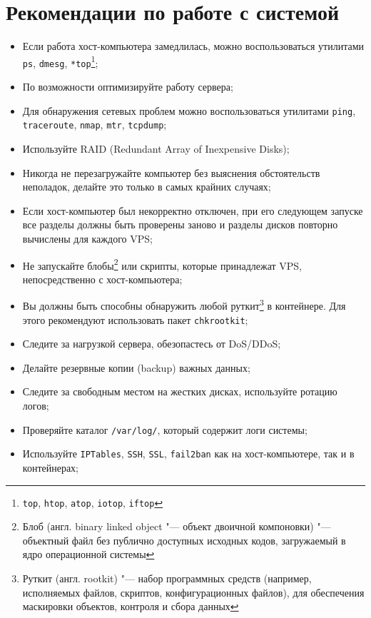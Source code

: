 \section{Рекомендации по работе с системой}
\begin{itemize}
    \item Если работа хост-компьютера замедлилась, можно воспользоваться утилитами \texttt{ps}, \texttt{dmesg}, \texttt{*top}\footnote{\texttt{top}, \texttt{htop}, \texttt{atop}, \texttt{iotop}, \texttt{iftop}};
    \item По возможности оптимизируйте работу сервера;
    \item Для обнаружения сетевых проблем можно воспользоваться утилитами \texttt{ping}, \texttt{traceroute}, \texttt{nmap}, \texttt{mtr}, \texttt{tcpdump};
    \item Используйте RAID (Redundant Array of Inexpensive Disks);
    \item Никогда не перезагружайте компьютер без выяснения обстоятельств неполадок, делайте это только в самых крайних случаях;
    \item Если хост-компьютер был некорректно отключен, при его следующем запуске все разделы должны быть проверены заново и разделы дисков повторно вычислены для каждого VPS;
    \item Не запускайте блобы\footnote{Блоб (англ. binary linked object "--- объект двоичной компоновки) "--- объектный файл без публично доступных исходных кодов, загружаемый в ядро операционной системы} или скрипты, которые принадлежат VPS, непосредственно с хост-компьютера;
    \item Вы должны быть способны обнаружить любой руткит\footnote{Руткит (англ. rootkit) "--- набор программных средств (например, исполняемых файлов, скриптов, конфигурационных файлов), для обеспечения маскировки объектов, контроля и сбора данных} в контейнере. Для этого рекомендуют использовать пакет \texttt{chkrootkit};
    \item Следите за нагрузкой сервера, обезопастесь от DoS/DDoS;
    \item Делайте резервные копии (backup) важных данных;
    \item Следите за свободным местом на жестких дисках, используйте ротацию логов;
    \item Проверяйте каталог \texttt{/var/log/}, который содержит логи системы;
    \item Используйте \texttt{IPTables}, \texttt{SSH}, \texttt{SSL}, \texttt{fail2ban} как на хост-компьютере, так и в контейнерах;

\end{itemize}

